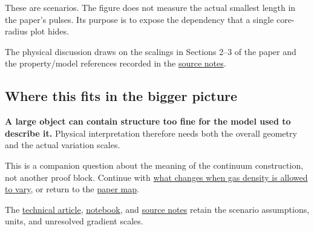 \documentclass[
  english,
  11pt,
]{article}
\begin{document}
These are scenarios. The figure does not measure the actual smallest
length in the paper's pulses. Its purpose is to expose the dependency
that a single core-radius plot hides.

The physical discussion draws on the scalings in Sections 2--3 of the
paper and the property/model references recorded in the
\href{source-notes.md}{source notes}.

\subsection{Where this fits in the bigger
picture}\label{where-this-fits-in-the-bigger-picture}

\textbf{A large object can contain structure too fine for the model used
to describe it.} Physical interpretation therefore needs both the
overall geometry and the actual variation scales.

This is a companion question about the meaning of the continuum
construction, not another proof block. Continue with
\href{../d10_compressible_vortex/article.html}{what changes when gas
density is allowed to vary}, or return to the
\href{../paper-map/article.html}{paper map}.

The \href{technical-article.html}{technical article},
\href{../../code/d9_regime_map/study.ipynb}{notebook}, and
\href{source-notes.md}{source notes} retain the scenario assumptions,
units, and unresolved gradient scales.
\end{document}
